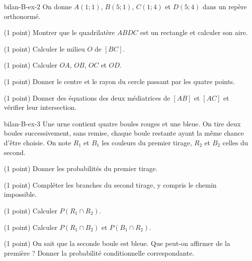 \begin{blocEdition}{bilan-B-ex-2}
On donne $A(1;1)$, $B(5;1)$, $C(1;4)$ et $D(5;4)$ dans un repère orthonormé.\begin{questions}
\item (1 point) Montrer que le quadrilatère $ABDC$ est un rectangle et calculer son aire.
\item (1 point) Calculer le milieu $O$ de $[BC]$.
\item (1 point) Calculer $OA$, $OB$, $OC$ et $OD$.
\item (1 point) Donner le centre et le rayon du cercle passant par les quatre points.
\item (1 point) Donner des équations des deux médiatrices de $[AB]$ et $[AC]$ et vérifier leur intersection.
\end{questions}\label{fig-bilan-B-ex-2}

\end{blocEdition}
\begin{blocEdition}{bilan-B-ex-3}
Une urne contient quatre boules rouges et une bleue. On tire deux boules successivement, sans remise, chaque boule restante ayant la même chance d’être choisie. On note $R_1$ et $B_1$ les couleurs du premier tirage, $R_2$ et $B_2$ celles du second.\begin{questions}
\item (1 point) Donner les probabilités du premier tirage.
\item (1 point) Compléter les branches du second tirage, y compris le chemin impossible.
\item (1 point) Calculer $P(R_1\cap R_2)$.
\item (1 point) Calculer $P(R_1\cap B_2)$ et $P(B_1\cap R_2)$.
\item (1 point) On sait que la seconde boule est bleue. Que peut-on affirmer de la première ? Donner la probabilité conditionnelle correspondante.
\end{questions}\label{fig-bilan-B-ex-3}

\end{blocEdition}
